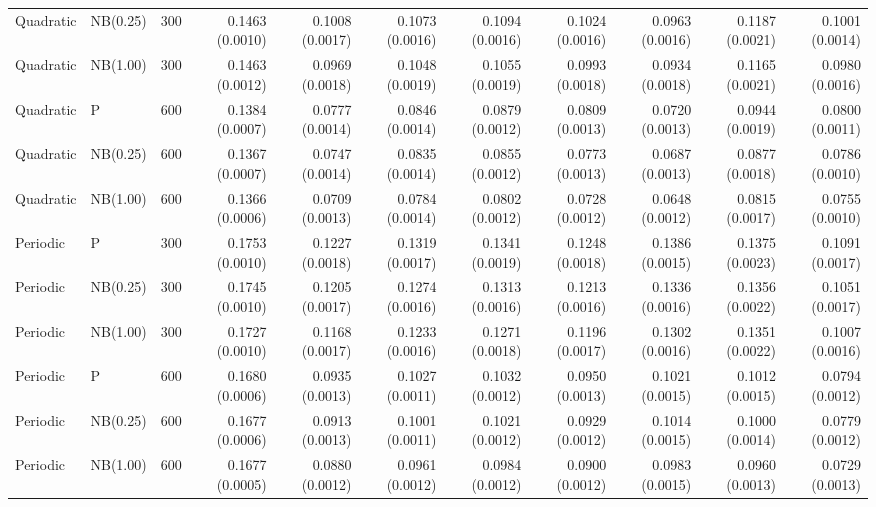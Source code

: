 \begin{table}[p]
{\begin{tabular}{lllrrrrrrrr}
Quadratic & NB(0.25) & 300 & 0.1463 (0.0010) & 0.1008 (0.0017) & 0.1073 (0.0016) & 0.1094 (0.0016) & 0.1024 (0.0016) & 0.0963 (0.0016) & 0.1187 (0.0021) & 0.1001 (0.0014) \\
Quadratic & NB(1.00) & 300 & 0.1463 (0.0012) & 0.0969 (0.0018) & 0.1048 (0.0019) & 0.1055 (0.0019) & 0.0993 (0.0018) & 0.0934 (0.0018) & 0.1165 (0.0021) & 0.0980 (0.0016) \\
Quadratic & P & 600 & 0.1384 (0.0007) & 0.0777 (0.0014) & 0.0846 (0.0014) & 0.0879 (0.0012) & 0.0809 (0.0013) & 0.0720 (0.0013) & 0.0944 (0.0019) & 0.0800 (0.0011) \\
Quadratic & NB(0.25) & 600 & 0.1367 (0.0007) & 0.0747 (0.0014) & 0.0835 (0.0014) & 0.0855 (0.0012) & 0.0773 (0.0013) & 0.0687 (0.0013) & 0.0877 (0.0018) & 0.0786 (0.0010) \\
Quadratic & NB(1.00) & 600 & 0.1366 (0.0006) & 0.0709 (0.0013) & 0.0784 (0.0014) & 0.0802 (0.0012) & 0.0728 (0.0012) & 0.0648 (0.0012) & 0.0815 (0.0017) & 0.0755 (0.0010) \\
\hline
Periodic & P & 300 & 0.1753 (0.0010) & 0.1227 (0.0018) & 0.1319 (0.0017) & 0.1341 (0.0019) & 0.1248 (0.0018) & 0.1386 (0.0015) & 0.1375 (0.0023) & 0.1091 (0.0017) \\
Periodic & NB(0.25) & 300 & 0.1745 (0.0010) & 0.1205 (0.0017) & 0.1274 (0.0016) & 0.1313 (0.0016) & 0.1213 (0.0016) & 0.1336 (0.0016) & 0.1356 (0.0022) & 0.1051 (0.0017) \\
Periodic & NB(1.00) & 300 & 0.1727 (0.0010) & 0.1168 (0.0017) & 0.1233 (0.0016) & 0.1271 (0.0018) & 0.1196 (0.0017) & 0.1302 (0.0016) & 0.1351 (0.0022) & 0.1007 (0.0016) \\
Periodic & P & 600 & 0.1680 (0.0006) & 0.0935 (0.0013) & 0.1027 (0.0011) & 0.1032 (0.0012) & 0.0950 (0.0013) & 0.1021 (0.0015) & 0.1012 (0.0015) & 0.0794 (0.0012) \\
Periodic & NB(0.25) & 600 & 0.1677 (0.0006) & 0.0913 (0.0013) & 0.1001 (0.0011) & 0.1021 (0.0012) & 0.0929 (0.0012) & 0.1014 (0.0015) & 0.1000 (0.0014) & 0.0779 (0.0012) \\
Periodic & NB(1.00) & 600 & 0.1677 (0.0005) & 0.0880 (0.0012) & 0.0961 (0.0012) & 0.0984 (0.0012) & 0.0900 (0.0012) & 0.0983 (0.0015) & 0.0960 (0.0013) & 0.0729 (0.0013) \\
\hline
\end{tabular}%
}
\end{table}
